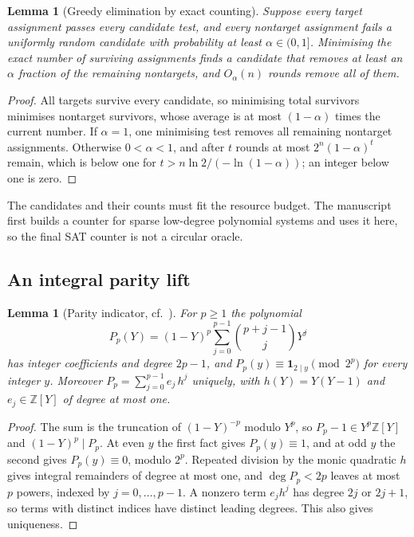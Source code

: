 \documentclass[11pt,reqno]{amsart}
\numberwithin{equation}{section}
\theoremstyle{plain}
\newtheorem{lemma}[theorem]{Lemma}
\theoremstyle{definition}
\theoremstyle{remark}
\newcommand{\Z}{\mathbb Z}
\newcommand{\ind}{\mathbf 1}
\begin{document}
\begin{lemma}[Greedy elimination by exact counting]\label{lem:greedy}
Suppose every target assignment passes every candidate test, and every
nontarget assignment fails a uniformly random candidate with probability at
least $\alpha\in(0,1]$. Minimising the exact number of surviving assignments
finds a candidate that removes at least an $\alpha$ fraction of the remaining
nontargets, and $O_\alpha(n)$ rounds remove all of them.
\end{lemma}
\begin{proof}
All targets survive every candidate, so minimising total survivors minimises
nontarget survivors, whose average is at most $(1-\alpha)$ times the current
number. If $\alpha=1$, one minimising test removes all remaining nontarget
assignments. Otherwise $0<\alpha<1$, and after $t$ rounds at most
$2^n(1-\alpha)^t$ remain, which is below one for
$t>n\ln2/(-\ln(1-\alpha))$; an integer below one is zero.
\end{proof}
The candidates and their counts must fit the resource budget. The manuscript
first builds a counter for sparse low-degree polynomial systems and uses it
here, so the final SAT counter is not a circular oracle.

\subsection{An integral parity lift}
\begin{lemma}[Parity indicator, cf.\ {\cite[Lemma~5.1]{OpenAIPaper}}]
\label{lem:parity}
For $p\ge1$ the polynomial
\begin{equation}\label{eq:parity}
 P_p(Y)=(1-Y)^p\sum_{j=0}^{p-1}\binom{p+j-1}{j}Y^j
\end{equation}
has integer coefficients and degree $2p-1$, and $P_p(y)\equiv\ind_{2\mid y}
\pmod{2^p}$ for every integer $y$. Moreover $P_p=\sum_{j=0}^{p-1}e_j\,h^j$
uniquely, with $h(Y)=Y(Y-1)$ and $e_j\in\Z[Y]$ of degree at most one.
\end{lemma}
\begin{proof}
The sum is the truncation of $(1-Y)^{-p}$ modulo $Y^p$, so
$P_p-1\in Y^p\Z[Y]$ and $(1-Y)^p\mid P_p$. At even $y$ the first fact gives
$P_p(y)\equiv1$, and at odd $y$ the second gives $P_p(y)\equiv0$, modulo
$2^p$. Repeated division by the monic quadratic $h$ gives integral
remainders of degree at most one, and $\deg P_p<2p$ leaves at most $p$
powers, indexed by $j=0,\ldots,p-1$. A nonzero term $e_jh^j$ has degree
$2j$ or $2j+1$, so terms with distinct indices have distinct leading
degrees. This also gives uniqueness.
\end{proof}
\end{document}
